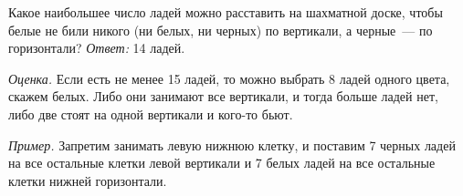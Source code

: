 \problem
Какое наибольшее число ладей можно расставить на шахматной доске, чтобы белые
не били никого (ни белых, ни черных) по вертикали, а черные~--- по горизонтали?
\solution
\emph{Ответ:} 14 ладей.
\par
\emph{Оценка.}
Если есть не менее 15 ладей, то можно выбрать 8 ладей одного цвета, скажем
белых.
Либо они занимают все вертикали, и тогда больше ладей нет, либо две стоят на
одной вертикали и кого-то бьют.
\par
\emph{Пример.}
Запретим занимать левую нижнюю клетку, и поставим 7 черных ладей на все
остальные клетки левой вертикали и 7 белых ладей на все остальные клетки нижней
горизонтали.
\endproblem
